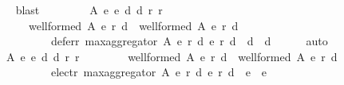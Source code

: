 \begin{isabellebody}
\ \ \ \ \isamarkupfalse%
\ blast\isanewline
\ \ \isamarkupfalse%
\ \isamarkupfalse%
\isanewline
\ \ \ \ {\isachardoublequoteopen}{\isasymforall}A\ e{}\ e{}\ d{}\ d{}\ r{}\ r{}{\isachardot}{\kern0pt}\isanewline
\ \ \ \ \ \ \ \ {\isacharparenleft}{\kern0pt}well{\isacharunderscore}{\kern0pt}formed\ A\ {\isacharparenleft}{\kern0pt}e{}{\isacharcomma}{\kern0pt}\ r{}{\isacharcomma}{\kern0pt}\ d{}{\isacharparenright}{\kern0pt}\ {\isasymand}\ well{\isacharunderscore}{\kern0pt}formed\ A\ {\isacharparenleft}{\kern0pt}e{}{\isacharcomma}{\kern0pt}\ r{}{\isacharcomma}{\kern0pt}\ d{}{\isacharparenright}{\kern0pt}{\isacharparenright}{\kern0pt}\ {\isasymlongrightarrow}\isanewline
\ \ \ \ \ \ \ \ \ \ \ \ defer{\isacharunderscore}{\kern0pt}r\ {\isacharparenleft}{\kern0pt}max{\isacharunderscore}{\kern0pt}aggregator\ A\ {\isacharparenleft}{\kern0pt}e{}{\isacharcomma}{\kern0pt}\ r{}{\isacharcomma}{\kern0pt}\ d{}{\isacharparenright}{\kern0pt}\ {\isacharparenleft}{\kern0pt}e{}{\isacharcomma}{\kern0pt}\ r{}{\isacharcomma}{\kern0pt}\ d{}{\isacharparenright}{\kern0pt}{\isacharparenright}{\kern0pt}\ {\isasymsubseteq}\ {\isacharparenleft}{\kern0pt}d{}\ {\isasymunion}\ d{}{\isacharparenright}{\kern0pt}{\isachardoublequoteclose}\isanewline
\ \ \ \ \isamarkupfalse%
\ auto\isanewline
\ \ \isamarkupfalse%
\ \isamarkupfalse%
\isanewline
\ \ \ \ {\isachardoublequoteopen}{\isasymforall}A\ e{}\ e{}\ d{}\ d{}\ r{}\ r{}{\isachardot}{\kern0pt}\isanewline
\ \ \ \ \ \ \ \ {\isacharparenleft}{\kern0pt}well{\isacharunderscore}{\kern0pt}formed\ A\ {\isacharparenleft}{\kern0pt}e{}{\isacharcomma}{\kern0pt}\ r{}{\isacharcomma}{\kern0pt}\ d{}{\isacharparenright}{\kern0pt}\ {\isasymand}\ well{\isacharunderscore}{\kern0pt}formed\ A\ {\isacharparenleft}{\kern0pt}e{}{\isacharcomma}{\kern0pt}\ r{}{\isacharcomma}{\kern0pt}\ d{}{\isacharparenright}{\kern0pt}{\isacharparenright}{\kern0pt}\ {\isasymlongrightarrow}\isanewline
\ \ \ \ \ \ \ \ \ \ \ \ {\isacharparenleft}{\kern0pt}elect{\isacharunderscore}{\kern0pt}r\ {\isacharparenleft}{\kern0pt}max{\isacharunderscore}{\kern0pt}aggregator\ A\ {\isacharparenleft}{\kern0pt}e{}{\isacharcomma}{\kern0pt}\ r{}{\isacharcomma}{\kern0pt}\ d{}{\isacharparenright}{\kern0pt}\ {\isacharparenleft}{\kern0pt}e{}{\isacharcomma}{\kern0pt}\ r{}{\isacharcomma}{\kern0pt}\ d{}{\isacharparenright}{\kern0pt}{\isacharparenright}{\kern0pt}\ {\isasymsubseteq}\ {\isacharparenleft}{\kern0pt}e{}\ {\isasymunion}\ e{}{\isacharparenright}{\kern0pt}\ {\isasymand}\isanewline

\end{isabellebody}
